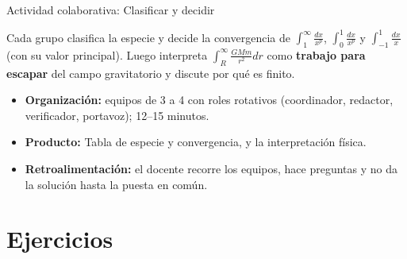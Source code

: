 \documentclass[10pt,aspectratio=169]{beamer}
\begin{document}
\begin{frame}{Actividad colaborativa: Clasificar y decidir}
  \small
  \begin{activa}
    Cada grupo clasifica la especie y decide la convergencia de $\int_1^\infty\frac{dx}{x^p}$, $\int_0^1\frac{dx}{x^p}$ y $\int_{-1}^1\frac{dx}{x}$ (con su valor principal). Luego interpreta $\int_R^\infty\frac{GMm}{r^2}dr$ como \textbf{trabajo para escapar} del campo gravitatorio y discute por qué es finito.
  \end{activa}
  \begin{itemize}
    \item \textbf{Organización:} equipos de 3 a 4 con roles rotativos (coordinador, redactor, verificador, portavoz); 12--15 minutos.
    \item \textbf{Producto:} Tabla de especie y convergencia, y la interpretación física.
    \item \textbf{Retroalimentación:} el docente recorre los equipos, hace preguntas y no da la solución hasta la puesta en común.
  \end{itemize}
\end{frame}

\section{Ejercicios}
\end{document}
